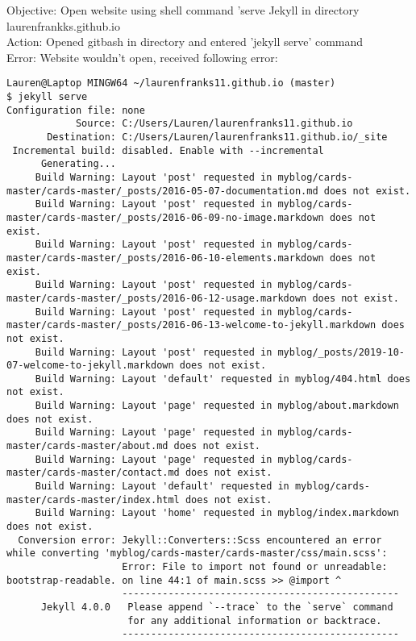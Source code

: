 \documentclass{article}
\begin{document}
Objective: Open website using shell command 'serve Jekyll in directory laurenfrankks.github.io\\
Action: Opened gitbash in directory and entered 'jekyll serve' command \\
Error: Website wouldn't open, received following error:
\begin{verbatim}
Lauren@Laptop MINGW64 ~/laurenfranks11.github.io (master)
$ jekyll serve
Configuration file: none
            Source: C:/Users/Lauren/laurenfranks11.github.io
       Destination: C:/Users/Lauren/laurenfranks11.github.io/_site
 Incremental build: disabled. Enable with --incremental
      Generating...
     Build Warning: Layout 'post' requested in myblog/cards-master/cards-master/_posts/2016-05-07-documentation.md does not exist.
     Build Warning: Layout 'post' requested in myblog/cards-master/cards-master/_posts/2016-06-09-no-image.markdown does not exist.
     Build Warning: Layout 'post' requested in myblog/cards-master/cards-master/_posts/2016-06-10-elements.markdown does not exist.
     Build Warning: Layout 'post' requested in myblog/cards-master/cards-master/_posts/2016-06-12-usage.markdown does not exist.
     Build Warning: Layout 'post' requested in myblog/cards-master/cards-master/_posts/2016-06-13-welcome-to-jekyll.markdown does not exist.
     Build Warning: Layout 'post' requested in myblog/_posts/2019-10-07-welcome-to-jekyll.markdown does not exist.
     Build Warning: Layout 'default' requested in myblog/404.html does not exist.
     Build Warning: Layout 'page' requested in myblog/about.markdown does not exist.
     Build Warning: Layout 'page' requested in myblog/cards-master/cards-master/about.md does not exist.
     Build Warning: Layout 'page' requested in myblog/cards-master/cards-master/contact.md does not exist.
     Build Warning: Layout 'default' requested in myblog/cards-master/cards-master/index.html does not exist.
     Build Warning: Layout 'home' requested in myblog/index.markdown does not exist.
  Conversion error: Jekyll::Converters::Scss encountered an error while converting 'myblog/cards-master/cards-master/css/main.scss':
                    Error: File to import not found or unreadable: bootstrap-readable. on line 44:1 of main.scss >> @import ^
                    ------------------------------------------------
      Jekyll 4.0.0   Please append `--trace` to the `serve` command
                     for any additional information or backtrace.
                    ------------------------------------------------
\end{verbatim}
\end{document}

